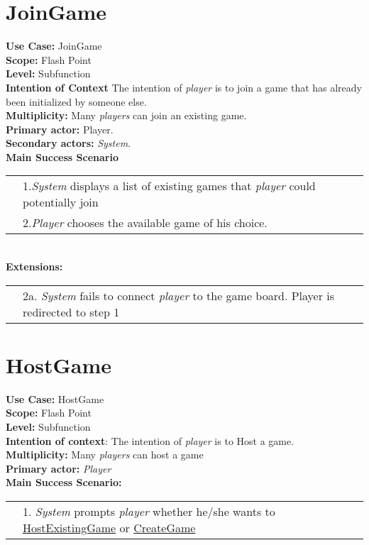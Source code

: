 \documentclass{article}
\begin{document}
	\section*{JoinGame}
	\textbf{Use Case:} JoinGame\\
	\textbf{Scope:}
	Flash Point\\
	\textbf{Level:}
	Subfunction\\
	\textbf{Intention of Context}
	The intention of \textit{player} is to join a game that has already been initialized by someone else.\\
	\textbf{Multiplicity:}
	Many \textit{players} can join an existing game.\\
	\textbf{Primary actor: }
	Player.\\
	\textbf{Secondary actors:} \textit{System}.\\
	\textbf{Main Success Scenario}\\
	\begin{tabular}{l l}
		&1.\textit{System} displays a list of existing games that \textit{player} could potentially join\\
		&2.\textit{Player} chooses the available game of his choice.
	\end{tabular}\\
	\textbf{Extensions:}\\
	\begin{tabular}{l l}
		&2a. \textit{System} fails to connect \textit{player} to the game board. Player is redirected to step 1\\
	\end{tabular}
	
	\section*{HostGame}
	\textbf{Use Case:}  HostGame\\
	\textbf{Scope:} Flash Point\\
	\textbf{Level:} Subfunction\\
	\textbf{Intention of context}: 
	The intention of \textit{player} is to Host a game.\\
	\textbf{Multiplicity:} Many \textit{players} can host a game\\
	\textbf{Primary actor:} \textit{Player}\\
	\textbf{Main Success Scenario:}\\
	\begin{tabular}{l l}
		&1. \textit{System} prompts \textit{player} whether he/she wants to \underline{HostExistingGame} or \underline{CreateGame}\\
	\end{tabular}
\end{document}
